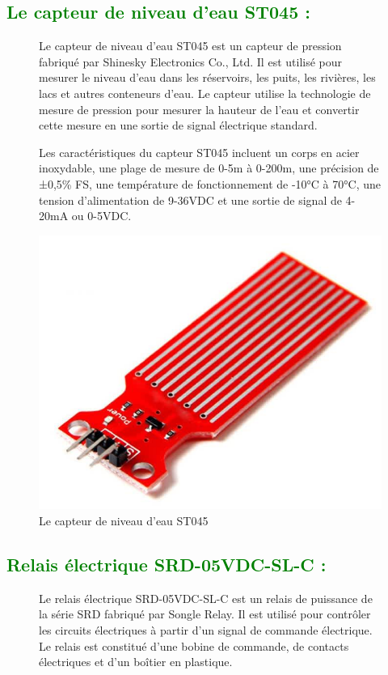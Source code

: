 \begin{flushleft}
	\subsection{\textcolor{green}{Le capteur de niveau d’eau ST045 :}}
		\begin{figure}[h]
			\begin{minipage}{0.6\textwidth}
				Le capteur de niveau d'eau ST045 est un capteur de pression fabriqué par Shinesky Electronics Co., Ltd. Il est utilisé pour mesurer le niveau d'eau dans les réservoirs, les puits, les rivières, les lacs et autres conteneurs d'eau. Le capteur utilise la technologie de mesure de pression pour mesurer la hauteur de l'eau et convertir cette mesure en une sortie de signal électrique standard.
				
				Les caractéristiques du capteur ST045 incluent un corps en acier inoxydable, une plage de mesure de 0-5m à 0-200m, une précision de ±0,5\% FS, une température de fonctionnement de -10°C à 70°C, une tension d'alimentation de 9-36VDC et une sortie de signal de 4-20mA ou 0-5VDC.
			\end{minipage}
			\begin{minipage}{0.4\textwidth}
				\centering
				\includegraphics[width=\textwidth]{chapitres/images/waterlevelsensor.jpg}
				\caption{Le capteur de niveau d’eau ST045}
				\label{fig:votre_image}
			\end{minipage}
		\end{figure}
	\newpage
	\subsection{\textcolor{green}{Relais électrique SRD-05VDC-SL-C :}}
		\begin{figure}[h]
			\begin{minipage}{0.6\textwidth}
				Le relais électrique SRD-05VDC-SL-C est un relais de puissance de la série SRD fabriqué par Songle Relay. Il est utilisé pour contrôler les circuits électriques à partir d'un signal de commande électrique. Le relais est constitué d'une bobine de commande, de contacts électriques et d'un boîtier en plastique.
				

\end{minipage}
\end{figure}
\end{flushleft}
